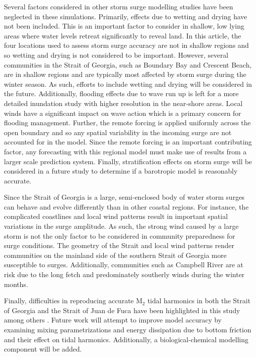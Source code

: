 \documentclass{tATO2e}
\begin{document}
Several factors considered in other storm surge modelling studies have been neglected in these simulations. Primarily, effects due to wetting and drying have not been included. This is an important factor to consider in shallow, low lying areas where water levels retreat significantly to reveal land. In this article, the four locations used to assess storm surge accuracy are not in shallow regions and so wetting and drying is not considered to be important. However, several communities in the Strait of Georgia, such as Boundary Bay and Crescent Beach, are in shallow regions and are typically most affected by storm surge during the winter season. As such, efforts to include wetting and drying will be considered in the future. Additionally, flooding effects due to wave run up is left for a more detailed inundation study with higher resolution in the near-shore areas. Local winds have a significant impact on wave action which is a primary concern for flooding management. Further, the remote forcing is applied uniformly across the open boundary and so any spatial variability in the incoming surge are not accounted for in the model. Since the remote forcing is an important contributing factor, any forecasting with this regional model must make use of results from a larger scale prediction system. Finally, stratification effects on storm surge will be considered in a future study to determine if a barotropic model is reasonably accurate. 

Since the Strait of Georgia is a large, semi-enclosed body of water storm surges can behave and evolve differently than in other coastal regions. For instance, the complicated coastlines and local wind patterns result in important spatial variations in the surge amplitude. As such, the strong wind caused by a large storm is not the only factor to be considered in community preparedness for surge conditions. The geometry of the Strait and local wind patterns render communities on the mainland side of the southern Strait of Georgia more susceptible to surges. Additionally, communities such as Campbell River are at risk due to the long fetch and predominately southerly winds during the winter months.

Finally, difficulties in reproducing accurate M$_2$ tidal harmonics in both the Strait of Georgia and the Strait of Juan de Fuca have been highlighted in this study among others \citep{stronach1993update, foreman2004m}. Future work will attempt to improve model accuracy by examining mixing parametrizations and energy dissipation due to bottom friction and their effect on tidal harmonics. Additionally, a biological-chemical modelling component will be added. 
\end{document}
